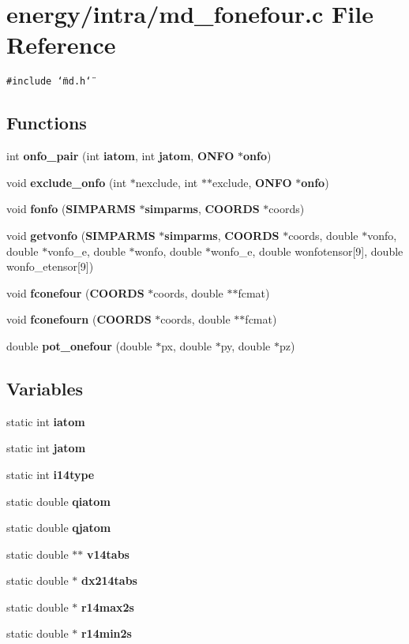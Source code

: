 \section{energy/intra/md\_\-fonefour.c File Reference}
\label{md__fonefour_8c}
{\tt \#include \char`\"{}md.h\char`\"{}}\par
\subsection*{Functions}
\begin{CompactItemize}
\item 
int {\bf onfo\_\-pair} (int {\bf iatom}, int {\bf jatom}, {\bf ONFO} $\ast${\bf onfo})
\item 
void {\bf exclude\_\-onfo} (int $\ast$nexclude, int $\ast$$\ast$exclude, {\bf ONFO} $\ast${\bf onfo})
\item 
void {\bf fonfo} ({\bf SIMPARMS} $\ast${\bf simparms}, {\bf COORDS} $\ast$coords)
\item 
void {\bf getvonfo} ({\bf SIMPARMS} $\ast${\bf simparms}, {\bf COORDS} $\ast$coords, double $\ast$vonfo, double $\ast$vonfo\_\-e, double $\ast$wonfo, double $\ast$wonfo\_\-e, double wonfotensor[9], double wonfo\_\-etensor[9])
\item 
void {\bf fconefour} ({\bf COORDS} $\ast$coords, double $\ast$$\ast$fcmat)
\item 
void {\bf fconefourn} ({\bf COORDS} $\ast$coords, double $\ast$$\ast$fcmat)
\item 
double {\bf pot\_\-onefour} (double $\ast$px, double $\ast$py, double $\ast$pz)
\end{CompactItemize}
\subsection*{Variables}
\begin{CompactItemize}
\item 
static int {\bf iatom}
\item 
static int {\bf jatom}
\item 
static int {\bf i14type}
\item 
static double {\bf qiatom}
\item 
static double {\bf qjatom}
\item 
static double $\ast$$\ast$ {\bf v14tabs}
\item 
static double $\ast$ {\bf dx214tabs}
\item 
static double $\ast$ {\bf r14max2s}
\item 
static double $\ast$ {\bf r14min2s}
\end{CompactItemize}


